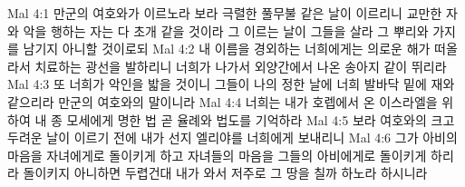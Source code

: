 Mal 4:1  만군의 여호와가 이르노라 보라 극렬한 풀무불 같은 날이 이르리니 교만한 자와 악을 행하는 자는 다 초개 같을 것이라 그 이르는 날이 그들을 살라 그 뿌리와 가지를 남기지 아니할 것이로되
Mal 4:2  내 이름을 경외하는 너희에게는 의로운 해가 떠올라서 치료하는 광선을 발하리니 너희가 나가서 외양간에서 나온 송아지 같이 뛰리라
Mal 4:3  또 너희가 악인을 밟을 것이니 그들이 나의 정한 날에 너희 발바닥 밑에 재와 같으리라 만군의 여호와의 말이니라
Mal 4:4  너희는 내가 호렙에서 온 이스라엘을 위하여 내 종 모세에게 명한 법 곧 율례와 법도를 기억하라
Mal 4:5  보라 여호와의 크고 두려운 날이 이르기 전에 내가 선지 엘리야를 너희에게 보내리니
Mal 4:6  그가 아비의 마음을 자녀에게로 돌이키게 하고 자녀들의 마음을 그들의 아비에게로 돌이키게 하리라 돌이키지 아니하면 두렵건대 내가 와서 저주로 그 땅을 칠까 하노라 하시니라


